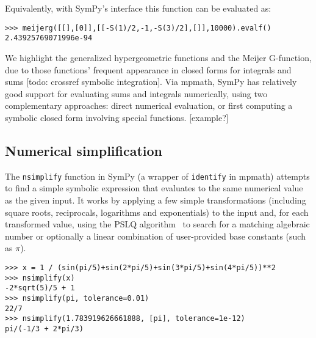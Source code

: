 Equivalently, with SymPy's interface this function can be evaluated as:
\begin{verbatim}
>>> meijerg([[],[0]],[[-S(1)/2,-1,-S(3)/2],[]],10000).evalf()
2.43925769071996e-94
\end{verbatim}

We highlight the generalized hypergeometric functions and
the Meijer G-function, due to those functions' frequent appearance
in closed forms for integrals and sums [todo: crossref symbolic integration].
Via mpmath, SymPy has relatively good support for evaluating sums and integrals
numerically, using two complementary approaches: direct numerical evaluation,
or first computing a symbolic closed form involving special functions. [example?]

\subsection{Numerical simplification}

The \texttt{nsimplify} function in SymPy
(a wrapper of \texttt{identify} in mpmath)
attempts to find a simple symbolic
expression that evaluates to the same numerical value as the given
input.
It works by applying a few simple transformations
(including square roots, reciprocals, logarithms and exponentials) to
the input and, for each transformed value,
using the PSLQ algorithm~\cite{Ferguson1999} to search for
a matching algebraic number or optionally a linear combination
of user-provided base constants (such as $\pi$).

\begin{verbatim}
>>> x = 1 / (sin(pi/5)+sin(2*pi/5)+sin(3*pi/5)+sin(4*pi/5))**2
>>> nsimplify(x)
-2*sqrt(5)/5 + 1
>>> nsimplify(pi, tolerance=0.01)
22/7
>>> nsimplify(1.783919626661888, [pi], tolerance=1e-12)
pi/(-1/3 + 2*pi/3)
\end{verbatim}
